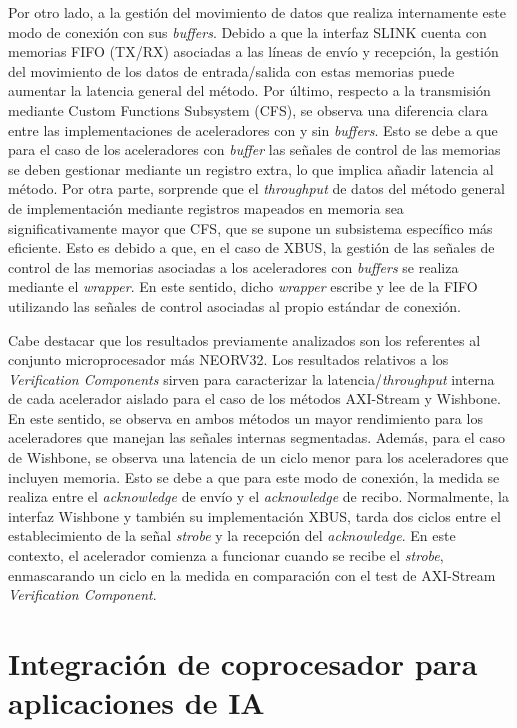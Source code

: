 Por otro lado, a la gestión del movimiento de datos que realiza internamente este modo de conexión con sus \textit{buffers}.
Debido a que la interfaz SLINK cuenta con memorias FIFO (TX/RX) asociadas a las líneas de envío y recepción, la gestión del movimiento de los datos de entrada/salida con estas memorias puede aumentar la latencia general del método.
Por último, respecto a la transmisión mediante Custom Functions Subsystem (CFS), se observa una diferencia clara entre las implementaciones de aceleradores con y sin \textit{buffers}.
Esto se debe a que para el caso de los aceleradores con \textit{buffer} las señales de control de las memorias se deben gestionar mediante un registro extra, lo que implica añadir latencia al método.
Por otra parte, sorprende que el \textit{throughput} de datos del método general de implementación mediante registros mapeados en memoria sea significativamente mayor que CFS, que se supone un subsistema específico más eficiente.
Esto es debido a que, en el caso de XBUS, la gestión de las señales de control de las memorias asociadas a los aceleradores con \textit{buffers} se realiza mediante el \textit{wrapper}.
En este sentido, dicho \textit{wrapper} escribe y lee de la FIFO utilizando las señales de control asociadas al propio estándar de conexión.

Cabe destacar que los resultados previamente analizados son los referentes al conjunto microprocesador más NEORV32.
Los resultados relativos a los \textit{Verification Components} sirven para caracterizar la latencia/\textit{throughput} interna de cada acelerador aislado para el caso de los métodos AXI-Stream y Wishbone.
En este sentido, se observa en ambos métodos un mayor rendimiento para los aceleradores que manejan las señales internas segmentadas.
Además, para el caso de Wishbone, se observa una latencia de un ciclo menor para los aceleradores que incluyen memoria.
Esto se debe a que para este modo de conexión, la medida se realiza entre el \textit{acknowledge} de envío y el \textit{acknowledge} de recibo.
Normalmente, la interfaz Wishbone y también su implementación XBUS, tarda dos ciclos entre el establecimiento de la señal \textit{strobe} y la recepción del \textit{acknowledge}.
En este contexto, el acelerador comienza a funcionar cuando se recibe el \textit{strobe}, enmascarando un ciclo en la medida en comparación con el test de AXI-Stream \textit{Verification Component}.

\section{Integración de coprocesador para aplicaciones de IA}

